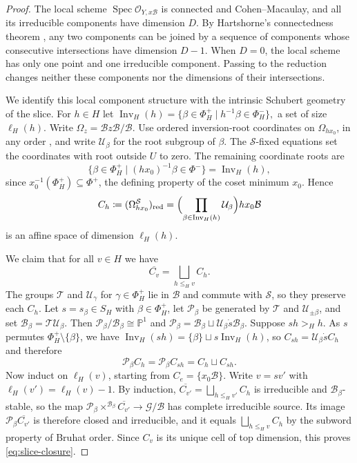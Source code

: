\documentclass[11pt]{amsart}
\theoremstyle{definition}
\theoremstyle{remark}
\numberwithin{equation}{section}
\begin{document}
\begin{proof}
The local scheme $\operatorname{Spec}\mathcal O_{Y,x\mathcal{B}}$ is
connected and Cohen--Macaulay, and all its irreducible components
have dimension $D$. By Hartshorne's connectedness theorem
\cite[Exp.~III, Thm.~3.6 and Cor.~3.7]{SGA2}, any two components can be joined by a sequence of components whose consecutive intersections have dimension $D-1$. When $D=0$, the local scheme
has only one point and one irreducible component. Passing to
the reduction changes neither these components nor the
dimensions of their intersections.

We identify this local component structure with the intrinsic
Schubert geometry of the slice. For
$h\in H$ let $\operatorname{Inv}_H(h)=\{\beta\in\Phi_H^+ \mid h^{-1}\beta\in\Phi_H^-\},$
a set of size $\ell_H(h)$. Write $\Omega_z=\mathcal{B}z\mathcal{B}/\mathcal{B}$. Use ordered inversion-root coordinates
on $\Omega_{hx_0}$, in any order \cite[Ch.~7]{Kumar}, and write
$\mathcal U_\beta$ for the root subgroup of $\beta$. The
$\mathcal S$-fixed equations set the coordinates with root outside
$U$ to zero. The remaining coordinate roots are
\[
 \{\beta\in\Phi_H^+ \mid (hx_0)^{-1}\beta\in\Phi^-\}
 =\operatorname{Inv}_H(h),
\]
since $x_0^{-1}(\Phi_H^+)\subseteq\Phi^+$, the defining property of
the coset minimum $x_0$. Hence
\[
 C_h\coloneqq(\Omega_{hx_0}^{\mathcal S})_{\mathrm{red}}
 =\Bigl(\prod_{\beta\in\operatorname{Inv}_H(h)}\mathcal U_\beta\Bigr)hx_0\mathcal{B}
\]
is an affine space of dimension $\ell_H(h)$.

We claim that for all $v \in H$ we have
\begin{equation}\label{eq:slice-closure}
 \overline{C_v}=\bigsqcup_{h\le_Hv}C_h.
\end{equation}
The groups $\mathcal T$ and $\mathcal U_\gamma$ for
$\gamma\in\Phi_H^+$ lie in $\mathcal{B}$ and commute with
$\mathcal S$, so they preserve each $C_h$. Let
$s=s_\beta\in S_H$ with $\beta\in\Phi_H^+$, let $\mathcal P_\beta$
be generated by $\mathcal T$ and $\mathcal U_{\pm\beta}$, and set
$\mathcal B_\beta=\mathcal T\mathcal U_\beta$. Then
$\mathcal P_\beta/\mathcal B_\beta\cong\mathbb P^1$ and
$\mathcal P_\beta=\mathcal B_\beta\sqcup\mathcal U_\beta \dot{s}\mathcal B_\beta$. Suppose
$sh>_Hh$. As $s$ permutes $\Phi_H^+\setminus\{\beta\}$, we have
$\operatorname{Inv}_H(sh)=\{\beta\}\sqcup s\operatorname{Inv}_H(h)$,
so $C_{sh}=\mathcal U_\beta \dot{s}C_h$ and therefore
\[
 \mathcal P_\beta C_h=\mathcal P_\beta C_{sh}=C_h\sqcup C_{sh}.
\]
Now induct on $\ell_H(v)$, starting from $C_e=\{x_0\mathcal{B}\}$.
Write $v=sv'$ with $\ell_H(v')=\ell_H(v)-1$. By induction,
$\overline{C_{v'}}=\bigsqcup_{h\le_Hv'}C_h$ is irreducible and
$\mathcal B_\beta$-stable, so the map
$\mathcal P_\beta\times^{\mathcal B_\beta}\overline{C_{v'}}\to\mathcal{G}/\mathcal{B}$
has complete irreducible source. Its image
$\mathcal P_\beta\overline{C_{v'}}$ is therefore closed and
irreducible, and it equals $\bigsqcup_{h\le_Hv}C_h$ by the subword
property of Bruhat order. Since $C_v$ is its unique cell of top dimension, this
proves \eqref{eq:slice-closure}.


\end{proof}
\end{document}
